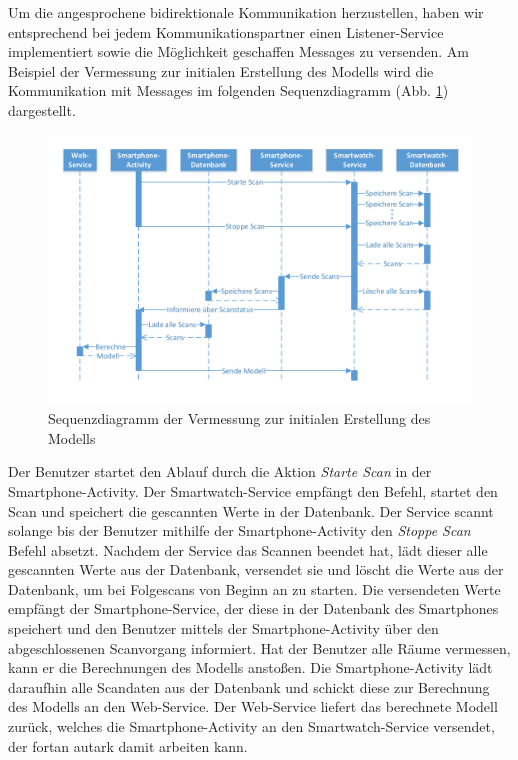 Um die angesprochene bidirektionale Kommunikation herzustellen, haben wir entsprechend
bei jedem Kommunikationspartner einen Listener-Service implementiert sowie die Möglichkeit geschaffen Messages zu versenden. Am Beispiel der Vermessung zur initialen Erstellung des Modells wird die Kommunikation mit Messages im folgenden Sequenzdiagramm (Abb. \ref{fig:SequenzdiagrammScan}) dargestellt.

\begin{figure}[H]
\centering
\includegraphics[width=0.99\linewidth]{../Bilder/SequenzdiagrammScan}
\caption{Sequenzdiagramm der Vermessung zur initialen Erstellung des Modells}
\label{fig:SequenzdiagrammScan}
\end{figure}

Der Benutzer startet den Ablauf durch die Aktion \textit{Starte Scan} in der Smartphone-Activity. Der Smartwatch-Service empfängt den Befehl, startet den Scan und speichert die gescannten Werte in der Datenbank. Der Service scannt solange bis der Benutzer mithilfe der Smartphone-Activity den \textit{Stoppe Scan} Befehl absetzt. Nachdem der Service das Scannen beendet hat, lädt dieser alle gescannten Werte aus der Datenbank, versendet sie und löscht die Werte aus der Datenbank, um bei Folgescans von Beginn an zu starten. Die versendeten Werte empfängt der Smartphone-Service, der diese in der Datenbank des Smartphones speichert und den Benutzer mittels der Smartphone-Activity über den abgeschlossenen Scanvorgang informiert. Hat der Benutzer alle Räume vermessen, kann er die Berechnungen des Modells anstoßen. Die Smartphone-Activity lädt daraufhin alle Scandaten aus der Datenbank und schickt diese zur Berechnung des Modells an den Web-Service. Der Web-Service liefert das berechnete Modell zurück, welches die Smartphone-Activity an den Smartwatch-Service versendet, der fortan autark damit arbeiten kann.


